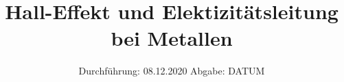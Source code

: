 

\subject{V311}
\title{Hall-Effekt und Elektizitätsleitung bei Metallen}
\date{%
  Durchführung: 08.12.2020
  \hspace{3em}
  Abgabe: DATUM
}



\maketitle
\thispagestyle{empty}
\tableofcontents
\newpage









